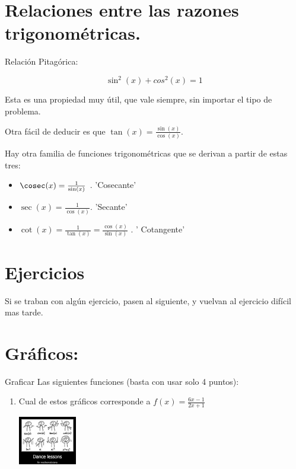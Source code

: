\documentclass[a4paper,11pt,spanish,sans]{exam}
\begin{document}

\section*{Relaciones entre las razones trigonométricas.}

Relación Pitagórica:

\[
\sin^2(x)+cos^2(x)=1
\]

Esta es una propiedad muy útil, que vale siempre, sin importar el tipo de  problema.

Otra fácil de deducir es que $\tan(x)=\frac{\sin (x)}{\cos (x)}$.

Hay otra familia de funciones trigonométricas que se derivan a partir de estas tres:

\begin{itemize}
\item  $\cosec (x)=\frac{1}{\sin (x)}$ .  'Cosecante'
\item  $\sec (x)=\frac{1}{\cos (x)}$.  'Secante'
\item  $\cot  (x)=\frac{1}{\tan (x)}=\frac{\cos (x)}{\sin(x)}$ . ' Cotangente'
\end{itemize}


\section*{Ejercicios}

Si se traban con algún ejercicio, pasen al siguiente, y vuelvan al ejercicio difícil mas tarde.




\section{Gráficos:}
Graficar Las siguientes funciones (basta con usar solo 4 puntos):

\begin{enumerate}%

\item Cual de estos gráficos corresponde a $f(x)=\frac{6x-1}{2x+1}$

\includegraphics[width=0.2\textwidth]{dance.jpg}
\caption{ }
\label{fig:dance}

\end{enumerate}
\end{document}

